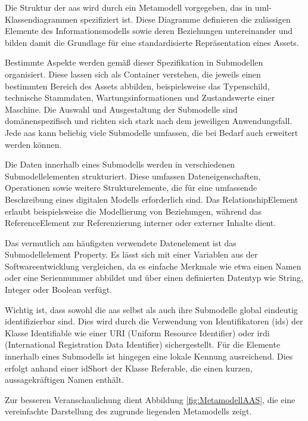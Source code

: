 Die Struktur der \acs{aas} wird durch ein Metamodell \cite{SpezifikationPart1} vorgegeben, das in \ac{uml}-Klassendiagrammen spezifiziert ist.
Diese Diagramme definieren die zulässigen Elemente des Informationsmodells sowie deren Beziehungen untereinander und bilden damit die Grundlage für eine standardisierte Repräsentation eines Assets.

Bestimmte Aspekte werden gemäß dieser Spezifikation in Submodellen organisiert.
Diese lassen sich als Container verstehen, die jeweils einen bestimmten Bereich des Assets abbilden, beispielsweise das Typenschild, technische Stammdaten, Wartungsinformationen und Zustandswerte einer Maschine.  
Die Auswahl und Ausgestaltung der Submodelle sind domänenspezifisch und richten sich stark nach dem jeweiligen Anwendungsfall.
Jede \acs{aas} kann beliebig viele Submodelle umfassen, die bei Bedarf auch erweitert werden können.

Die Daten innerhalb eines Submodells werden in verschiedenen Submodellelementen strukturiert.
Diese umfassen Dateneigenschaften, Operationen sowie weitere Strukturelemente, die für eine umfassende Beschreibung eines digitalen Modells erforderlich sind.
Das RelationshipElement erlaubt beispielsweise die Modellierung von Beziehungen, während das ReferenceElement zur Referenzierung interner oder externer Inhalte dient.

Das vermutlich am häufigsten verwendete Datenelement ist das Submodellelement 
\linebreak Property.
Es lässt sich mit einer Variablen aus der Softwareentwicklung vergleichen, da es einfache Merkmale wie etwa einen Namen oder eine Seriennummer abbildet und über einen definierten Datentyp wie String, Integer oder Boolean verfügt.

Wichtig ist, dass sowohl die \acs{aas} selbst als auch ihre Submodelle global eindeutig identifizierbar sind.
Dies wird durch die Verwendung von Identifikatoren (\acsp{id}) der Klasse Identifiable wie einer URI (Uniform Resource Identifier) oder \acs{irdi} (International Registration Data Identifier) sichergestellt.
Für die Elemente innerhalb eines Submodells ist hingegen eine lokale Kennung ausreichend. 
Dies erfolgt anhand einer idShort der Klasse Referable, die einen kurzen, aussagekräftigen Namen enthält.

Zur besseren Veranschaulichung dient Abbildung \ref{fig:MetamodellAAS}, die eine vereinfachte Darstellung des zugrunde liegenden Metamodells zeigt.

